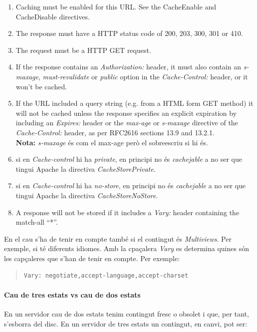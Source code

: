 \documentclass[a4paper, 11pt]{article}
\begin{document}
\begin{enumerate}
	\item Caching must be enabled for this URL. See the CacheEnable and CacheDisable directives.
	\item The response must have a HTTP status code of 200, 203, 300, 301 or 410.
	\item The request must be a HTTP GET request.
	\item If the response contains an \textit{Authorization:} header, it must also contain an \textit{s-maxage}, \textit{must-revalidate} or \textit{public} option in the \textit{Cache-Control:} header, or it won't be cached.
	\item If the URL included a query string (e.g. from a HTML form GET method) it will not be cached unless the response specifies an explicit expiration by including an \textit{Expires:} header or the \textit{max-age} or \textit{s-maxage} directive of the \textit{Cache-Control:} header, as per RFC2616 sections 13.9 and 13.2.1. \\
	\textbf{Nota:} \textit{s-maxage} \'es com el max-age però el sobreescriu si hi \'es.
  \item si en \textit{Cache-control} hi ha \textit{private}, en principi no \'es \textit{cachejable} a no ser que tingui Apache la directiva \textit{CacheStorePrivate}.
  \item si en \textit{Cache-control} hi ha \textit{no-store}, en principi no \'es \textit{cachejable} a no ser que tingui Apache la directiva \textit{CacheStoreNoStore}.
	\item A response will not be stored if it includes a \textit{Vary:} header containing the match-all ``*''.
\end{enumerate}

En el cau s'ha de tenir en compte tamb\'e si el contingut \'es \textit{Multiviews}. Per exemple, si t\'e diferents idiomes. Amb la cpaçalera \textit{Vary} es determina quines són les capçaleres que s'han de tenir en compte. Per exemple:
\begin{quote}
	\verb+Vary: negotiate,accept-language,accept-charset+
\end{quote}

\paragraph{Cau de tres estats vs cau de dos estats \\}

En un servidor cau de dos estats tenim contingut fresc o obsolet i que, per tant, s'esborra del disc. En un servidor de tres estats un contingut, en canvi, pot ser:
\end{document}
